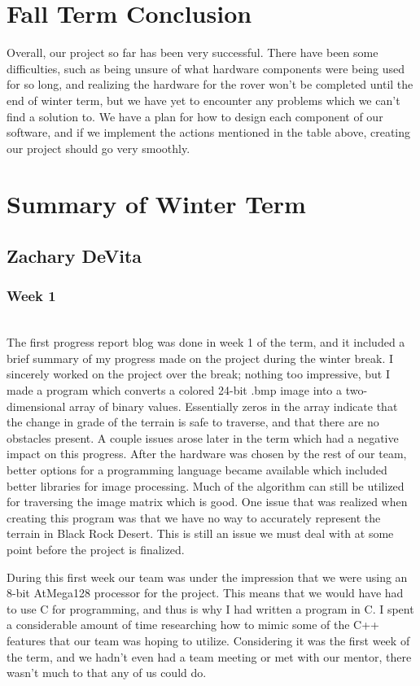 \documentclass[10pt,letterpaper,onecolumn,draftclsnofoot,journal]{IEEEtran}
\begin{document}
\section{Fall Term Conclusion}
Overall, our project so far has been very successful. There have been some difficulties, such as being unsure of what hardware components were being used for so long, and realizing the hardware for the rover won't be completed until the end of winter term, but we have yet to encounter any problems which we can't find a solution to. We have a plan for how to design each component of our software, and if we implement the actions mentioned in the table above, creating our project should go very smoothly.

\section{Summary of Winter Term}

\subsection{Zachary DeVita}
\subsubsection{Week 1}\hspace*{\fill}\\ 
The first progress report blog was done in week 1 of the term, and it included a brief summary of my progress made on the project during the winter break. I sincerely worked on the project over the break; nothing too impressive, but I made a program which converts a colored 24-bit .bmp image into a two-dimensional array of binary values. Essentially zeros in the array indicate that the change in grade of the terrain is safe to traverse, and that there are no obstacles present. A couple issues arose later in the term which had a negative impact on this progress. After the hardware was chosen by the rest of our team, better options for a programming language became available which included better libraries for image processing. Much of the algorithm can still be utilized for traversing the image matrix which is good. One issue that was realized when creating this program was that we have no way to accurately represent the terrain in Black Rock Desert. This is still an issue we must deal with at some point before the project is finalized.\vspace{.3cm}
\par
During this first week our team was under the impression that we were using an 8-bit AtMega128 processor for the project. This means that we would have had to use C for programming, and thus is why I had written a program in C. I spent a considerable amount of time researching how to mimic some of the C++ features that our team was hoping to utilize. Considering it was the first week of the term, and we hadn't even had a team meeting or met with our mentor, there wasn't much to that any of us could do.\vspace{.3cm}
\par
\end{document}
